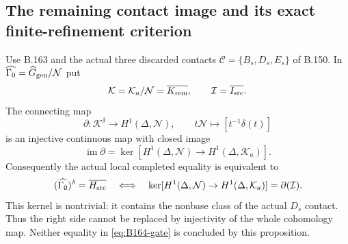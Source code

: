 \subsection*{The remaining contact image and its exact finite-refinement criterion}
\label{stmt:B164}
Use B.163 and the actual three discarded contacts
$\mathscr C=\{B_s,D_s,E_s\}$ of B.150. In
$\widehat{\Gamma_0}=\widehat G_{\rm gen}/\mathcal N$ put
\[
 \mathcal K=\mathcal K_a/\mathcal N=\overline{K_{\rm rem}},\qquad
 \mathcal I=\overline{I_{\rm src}}.
\]
The connecting map
\begin{equation}\label{eq:B164-connecting}
 \partial:\mathcal K^\delta\longrightarrow H^1(\Delta,\mathcal N),
 \qquad t\mathcal N\longmapsto[t^{-1}\delta(t)]
\end{equation}
is an injective continuous map with closed image
\[
 \operatorname{im}\partial
   =\ker[H^1(\Delta,\mathcal N)\to H^1(\Delta,\mathcal K_a)].
\]
Consequently the actual local completed equality is equivalent to
\begin{equation}\label{eq:B164-gate}
 (\widehat{\Gamma_0})^\delta=\overline{H_{\rm src}}\quad
 \Longleftrightarrow\quad
 \ker[H^1(\Delta,\mathcal N)\to H^1(\Delta,\mathcal K_a)]
          =\partial(\mathcal I).
\end{equation}
This kernel is nontrivial: it contains the nonbase class of the actual
$D_s$ contact. Thus the right side cannot be replaced by injectivity
of the whole cohomology map. Neither equality in
\eqref{eq:B164-gate} is concluded by this proposition.
